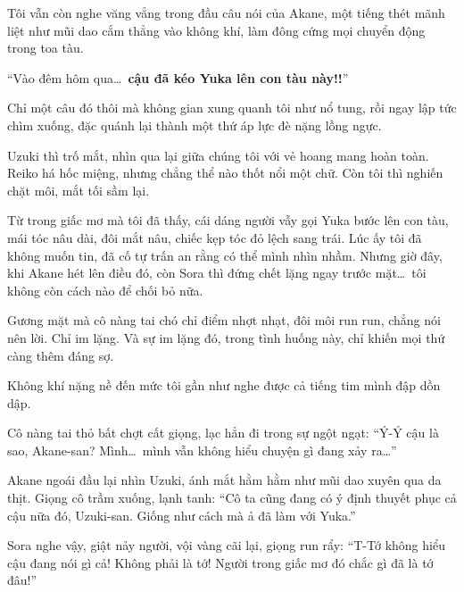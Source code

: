 \documentclass[../main.tex]{subfiles}
\begin{document}


Tôi vẫn còn nghe văng vẳng trong đầu câu nói của Akane, một tiếng thét mãnh liệt như mũi dao cắm thẳng vào không khí, làm đông cứng mọi chuyển động trong toa tàu.

``Vào đêm hôm qua\dots\ \textbf{cậu đã kéo Yuka lên con tàu này!!}''

Chỉ một câu đó thôi mà không gian xung quanh tôi như nổ tung, rồi ngay lập tức chìm xuống, đặc quánh lại thành một thứ áp lực đè nặng lồng ngực.

Uzuki thì trố mắt, nhìn qua lại giữa chúng tôi với vẻ hoang mang hoàn toàn. Reiko há hốc miệng, nhưng chẳng thể nào thốt nổi một chữ. Còn tôi thì nghiến chặt môi, mắt tối sầm lại.

Từ trong giấc mơ mà tôi đã thấy, cái dáng người vẫy gọi Yuka bước lên con tàu,  mái tóc nâu dài, đôi mắt nâu, chiếc kẹp tóc đỏ lệch sang trái. Lúc ấy tôi đã không muốn tin, đã cố tự trấn an rằng có thể mình nhìn nhầm. Nhưng giờ đây, khi Akane hét lên điều đó, còn Sora thì đứng chết lặng ngay trước mặt\dots\ tôi không còn cách nào để chối bỏ nữa.

Gương mặt mà cô nàng tai chó chỉ điểm nhợt nhạt, đôi môi run run, chẳng nói nên lời. Chỉ im lặng. Và sự im lặng đó, trong tình huống này, chỉ khiến mọi thứ càng thêm đáng sợ.

Không khí nặng nề đến mức tôi gần như nghe được cả tiếng tim mình đập dồn dập.

Cô nàng tai thỏ bất chợt cất giọng, lạc hẳn đi trong sự ngột ngạt: ``Ý-Ý cậu là sao, Akane-san? Mình\dots\ mình vẫn không hiểu chuyện gì đang xảy ra\dots''

Akane ngoái đầu lại nhìn Uzuki, ánh mắt hằm hằm như mũi dao xuyên qua da thịt. Giọng cô trầm xuống, lạnh tanh: ``Cô ta cũng đang có ý định thuyết phục cả cậu nữa đó, Uzuki-san. Giống như cách mà ả đã làm với Yuka.''

Sora nghe vậy, giật nảy người, vội vàng cãi lại, giọng run rẩy: ``T-Tớ không hiểu cậu đang nói gì cả! Không phải là tớ! Người trong giấc mơ đó chắc gì đã là tớ đâu!''
\end{document}
